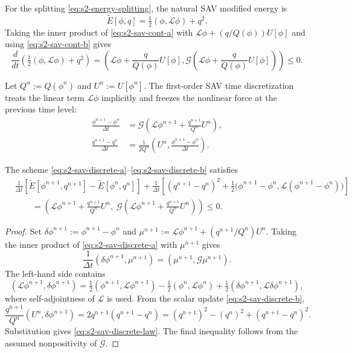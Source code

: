 \documentclass[10pt,onefignum,onetabnum,hidelinks]{siamart251216}
\begin{document}
For the splitting \eqref{eq:s2-energy-splitting}, the natural SAV modified energy is
\begin{equation}
\widetilde E[\phi,q]
=
\tfrac12(\phi,\mathcal L\phi)+q^2.
\label{eq:s2-modified-energy-scalar}
\end{equation}
Taking the inner product of \eqref{eq:s2-sav-cont-a} with
$\mathcal L\phi+(q/Q(\phi))U[\phi]$ and using \eqref{eq:s2-sav-cont-b} gives
\begin{equation}
\frac{d}{dt}\left(\tfrac12(\phi,\mathcal L\phi)+q^2\right)
=
\left(
\mathcal L\phi+\frac{q}{Q(\phi)}U[\phi],
\mathcal G\left(
\mathcal L\phi+\frac{q}{Q(\phi)}U[\phi]
\right)
\right)
\le0.
\label{eq:s2-sav-cont-energy-law}
\end{equation}

Let $Q^n:=Q(\phi^n)$ and $U^n:=U[\phi^n]$. The first-order SAV time discretization treats the linear term $\mathcal L\phi$ implicitly and freezes the nonlinear force at the previous time level:
\begin{align}
\frac{\phi^{n+1}-\phi^n}{\Delta t}
&=
\mathcal G\left(
\mathcal L\phi^{n+1}
+
\frac{q^{n+1}}{Q^n}U^n
\right),
\label{eq:s2-sav-discrete-a}
\\
\frac{q^{n+1}-q^n}{\Delta t}
&=
\frac{1}{2Q^n}
\left(
U^n,\frac{\phi^{n+1}-\phi^n}{\Delta t}
\right).
\label{eq:s2-sav-discrete-b}
\end{align}
\begin{proposition}
\label{prop:sav-energy-law}
The scheme \eqref{eq:s2-sav-discrete-a}--\eqref{eq:s2-sav-discrete-b} satisfies
\begin{align}
&\frac{1}{\Delta t}
\left[
\widetilde E[\phi^{n+1},q^{n+1}]
-
\widetilde E[\phi^n,q^n]
\right]
+
\frac{1}{\Delta t}
\left[
(q^{n+1}-q^n)^2
+
\tfrac12\bigl(\phi^{n+1}-\phi^n,\mathcal L(\phi^{n+1}-\phi^n)\bigr)
\right]
\nonumber\\
&\qquad
=
\left(
\mathcal L\phi^{n+1}+\frac{q^{n+1}}{Q^n}U^n,\;
\mathcal G\left(
\mathcal L\phi^{n+1}+\frac{q^{n+1}}{Q^n}U^n
\right)
\right)
\le0.
\label{eq:s2-sav-discrete-law}
\end{align}
\end{proposition}

\begin{proof}
Set
\(
\delta\phi^{n+1}:=\phi^{n+1}-\phi^n
\)
and
\(
\mu^{n+1}:=\mathcal L\phi^{n+1}+(q^{n+1}/Q^n)U^n
\).
Taking the inner product of \eqref{eq:s2-sav-discrete-a} with $\mu^{n+1}$ gives
\[
\frac1{\Delta t}(\delta\phi^{n+1},\mu^{n+1})
=
(\mu^{n+1},\mathcal G\mu^{n+1}).
\]
The left-hand side contains
\[
(\mathcal L\phi^{n+1},\delta\phi^{n+1})
=
\tfrac12(\phi^{n+1},\mathcal L\phi^{n+1})
-
\tfrac12(\phi^n,\mathcal L\phi^n)
+
\tfrac12(\delta\phi^{n+1},\mathcal L\delta\phi^{n+1}),
\]
where self-adjointness of $\mathcal L$ is used.  From the scalar update
\eqref{eq:s2-sav-discrete-b},
\[
\frac{q^{n+1}}{Q^n}(U^n,\delta\phi^{n+1})
=
2q^{n+1}(q^{n+1}-q^n)
=
(q^{n+1})^2-(q^n)^2+(q^{n+1}-q^n)^2.
\]
Substitution gives \eqref{eq:s2-sav-discrete-law}.  The final inequality follows from the assumed nonpositivity of $\mathcal G$.
\end{proof}
\end{document}
